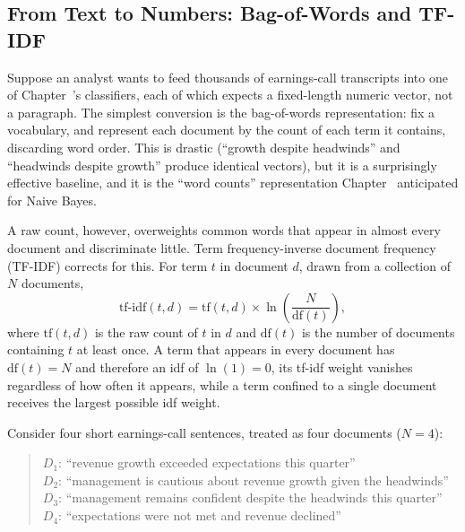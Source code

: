 \documentclass[../ai_in_finance]{subfiles}
\begin{document}
\subsection{From Text to Numbers: Bag-of-Words and TF-IDF}
\label{sec:bow-tfidf}

Suppose an analyst wants to feed thousands of earnings-call transcripts into one of Chapter~'s classifiers, each of which expects a fixed-length numeric vector, not a paragraph. The simplest conversion is the bag-of-words representation: fix a vocabulary, and represent each document by the count of each term it contains, discarding word order. This is drastic (``growth despite headwinds'' and ``headwinds despite growth'' produce identical vectors), but it is a surprisingly effective baseline, and it is the ``word counts'' representation Chapter~ anticipated for Naive Bayes.

A raw count, however, overweights common words that appear in almost every document and discriminate little. Term frequency-inverse document frequency (TF-IDF) corrects for this. For term $t$ in document $d$, drawn from a collection of $N$ documents,
\begin{equation}
\text{tf-idf}(t,d) = \text{tf}(t,d) \times \ln\!\left(\frac{N}{\text{df}(t)}\right),
\label{eq:nlp-tfidf}
\end{equation}
where $\text{tf}(t,d)$ is the raw count of $t$ in $d$ and $\text{df}(t)$ is the number of documents containing $t$ at least once. A term that appears in every document has $\text{df}(t)=N$ and therefore an idf of $\ln(1)=0$, its tf-idf weight vanishes regardless of how often it appears, while a term confined to a single document receives the largest possible idf weight.


Consider four short earnings-call sentences, treated as four documents ($N=4$):

\begin{quote}
\small
$D_1$: ``revenue growth exceeded expectations this quarter''\\
$D_2$: ``management is cautious about revenue growth given the headwinds''\\
$D_3$: ``management remains confident despite the headwinds this quarter''\\
$D_4$: ``expectations were not met and revenue declined''
\end{quote}
\end{document}

